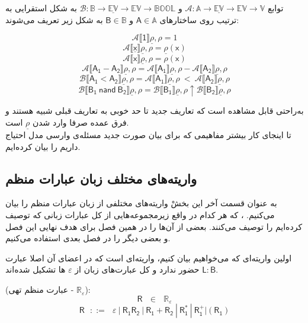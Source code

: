\begin{defn}
	توابع 
	$\mathcal{A}:\mathbb{A}\rightarrow \mathbb{\underline{EV}} \rightarrow
	\mathbb{EV} \rightarrow \mathbb{V}$
	و 
	$\mathcal{B}:\mathbb{B}\rightarrow \mathbb{\underline{EV}} \rightarrow
	\mathbb{EV} \rightarrow \mathbb{BOOL}$
	به شکل استقرایی به ترتیب روی ساختارهای 
	$\mathsf{A}\in\mathbb{A}$
	و
	$\mathsf{B} \in \mathbb{B}$
	به شکل زیر تعریف می‌شوند:
	
	
$$\mathcal{A}\llbracket\mathsf{1}\rrbracket\underline{\rho},\rho=1$$
$$\mathcal{A}\llbracket\mathsf{\underline{\mathsf{x}}}\rrbracket\underline{\rho},\rho= \underline{\rho}(\mathsf{x})$$
$$\mathcal{A}\llbracket\mathsf{\mathsf{x}}\rrbracket\underline{\rho},\rho= \rho(\mathsf{x})$$
$$\mathcal{A}\llbracket\mathsf{A_1 - A_2}\rrbracket\underline{\rho},\rho= 
\mathcal{A}\llbracket\mathsf{A_1}\rrbracket\underline{\rho},\rho - \mathcal{A}\llbracket\mathsf{A_2}\rrbracket\underline{\rho},\rho$$
$$\mathcal{B}\llbracket\mathsf{A_1 < A_2}\rrbracket\underline{\rho},\rho=
	\mathcal{A}\llbracket\mathsf{A_1}\rrbracket\underline{\rho},\rho\: <\: \mathcal{A}\llbracket\mathsf{A_2}\rrbracket\underline{\rho},\rho$$
$$\mathcal{B}\llbracket\mathsf{B_1\:nand\:B_2}\rrbracket\underline{\rho},\rho=
\mathcal{B}\llbracket\mathsf{B_1}\rrbracket\underline{\rho},\rho \uparrow 
\mathcal{B}\llbracket\mathsf{B_2}\rrbracket\underline{\rho},\rho $$
\end{defn}
به‌راحتی قابل مشاهده است که تعاریف جدید تا حد خوبی به تعاریف قبلی شبیه هستند و فرق عمده صرفا وارد شدن $\underline{\rho}$ است.\\
تا اینجای کار بیشتر مفاهیمی که برای بیان صورت جدید مسئله‌ی وارسی مدل احتیاج داریم را بیان کرده‌ایم. 
\subsection{واریته‌های مختلف زبان عبارات منظم}
به عنوان قسمت آخر این بخشْ واریته‌های مختلفی از زبان عبارات منظم را بیان می‌کنیم. ، که هر کدام در واقع زیرمجموعه‌هایی از کل عبارات زبانی که توصیف کرده‌ایم را توصیف می‌کنند. بعضی از آن‌ها را در همین فصل برای هدف نهایی این فصل و بعضی دیگر را در فصل بعدی استفاده می‌کنیم.

اولین واریته‌ای که می‌خواهیم بیان کنیم، واریته‌ای است که در اعضای آن اصلا عبارت 
$\mathsf{L : B}$
حضور ندارد و کل عبارت‌های زبان از $\varepsilon$ ها تشکیل شده‌اند.
\begin{defn}
	(عبارت منظم تهی - $\mathbb{R_\varepsilon}$): 
	$$\mathsf{R} \:\:\:\in\:\:\: \mathbb{R}_\varepsilon$$
	$$\mathsf{R}\:\:\: ::= \:\:\: \varepsilon \: | \: \mathsf{R_1 R_2} \: | 
	\: \mathsf{R_1 + R_2} \: | \: \mathsf{R_1^*} \: | \: \mathsf{R_1^+} | (\mathsf{R_1})$$
\end{defn}


